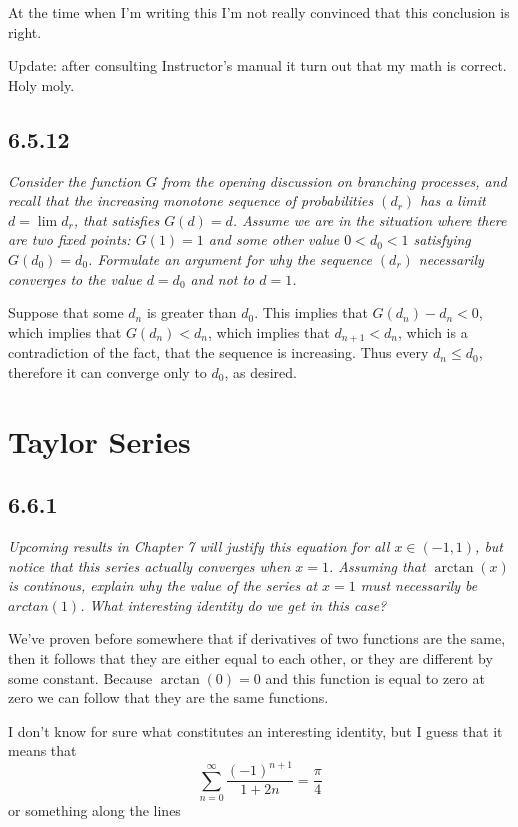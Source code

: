 \documentclass[11pt,oneside,titlepage]{book}
\begin{document}
At the time when I'm writing this
I'm not really convinced that this conclusion is right.

Update: after consulting Instructor's manual it turn out that my math is
correct. Holy moly.

\subsection*{6.5.12}
\textit{Consider the function $G$ from the opening discussion on branching
  processes, and recall that the increasing monotone sequence of probabilities
  $(d_r)$ has a limit $d = \lim{d_r}$, that satisfies $G(d) = d$. Assume we
  are in the situation where there are two fixed points: $G(1) = 1$ and some
  other value $0 < d_0 < 1$ satisfying $G(d_0) = d_0$. Formulate an argument
  for why the sequence $(d_r)$ necessarily converges to the value $d = d_0$
  and not to $d = 1$.}

Suppose that some  $d_n$ is greater than $d_0$.
This implies that $G(d_n) - d_n < 0$,
which implies that $G(d_n) < d_n$, which implies that $d_{n + 1} < d_n$, which
is a contradiction of the fact, that the sequence is increasing. Thus
every $d_n \leq d_0$, therefore it can converge only to $d_0$, as desired.

\section{Taylor Series}

\subsection*{6.6.1}
\textit{Upcoming results in Chapter 7 will justify this equation for all
  $x \in (-1, 1)$, but notice that this series actually converges when $x = 1$.
  Assuming that $\arctan(x)$ is continous, explain why the value of the series
  at $x = 1$ must necessarily be $arctan(1)$. What interesting identity do we
  get in this case?}

We've proven before somewhere that if derivatives of two functions are
the same, then it follows that they are either equal to each other, or
they are different by some constant. Because $\arctan(0) = 0$ and this
function is equal to zero at zero we can follow that they are the same
functions.

I don't know for sure what constitutes an interesting identity, but I guess
that it means that
$$\sum_{n = 0}^{\infty}{\frac{(-1)^{n + 1}}{1 + 2n}} = \frac{\pi}{4}$$
or something along the lines
\end{document}

